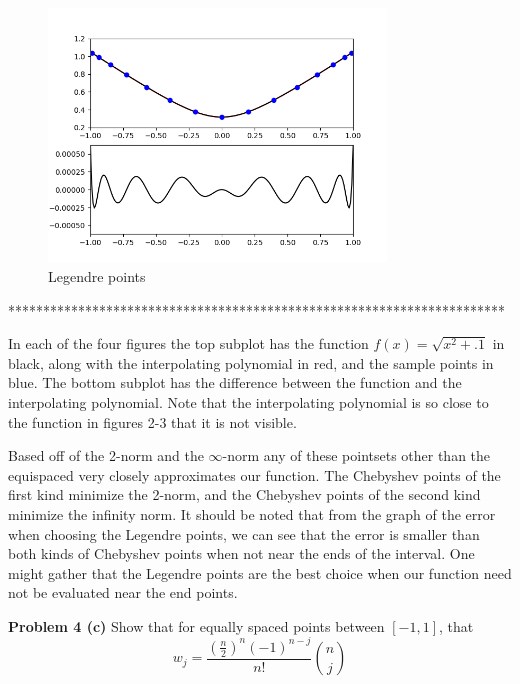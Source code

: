 \documentclass[12pt]{article}
\newcommand{\problem}[1]{\hspace{-4 ex} \large \textbf{Problem #1} }
\begin{document}
	\begin{figure}[H]
		\caption{Legendre points}
		\includegraphics[width=0.80\textwidth]{hw4_figure_4}
		\centering
	\end{figure}


***********************************************************************

	In each of the four figures the top subplot has the function $f(x) = \sqrt{x^2 + .1}$  in black, along with the interpolating polynomial in red, and the sample points in blue. The bottom subplot has the difference between the function and the interpolating polynomial. Note that the interpolating polynomial is so close to the function in figures 2-3 that it is not visible. \bigbreak
	
	Based off of the 2-norm and the $\infty$-norm any of these pointsets other than the equispaced very closely approximates our function. The Chebyshev points of the first kind minimize the 2-norm, and the Chebyshev points of the second kind minimize the infinity norm. It should be noted that from the graph of the error when choosing the Legendre points, we can see that the error is smaller than both kinds of Chebyshev points when not near the ends of the interval. One might gather that the Legendre points are the best choice when our function need not be evaluated near the end points. \bigbreak
	
\problem{4 (c)} Show that for equally spaced points between $[-1,1]$, that 
$$
w_j = \frac{ (\tfrac{n}{2})^n (-1)^{n-j} }{ n! }  {{n}\choose{j}}
$$
\end{document}
